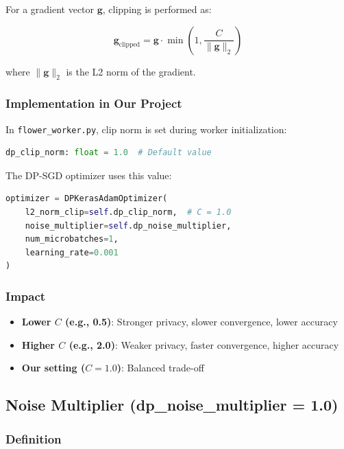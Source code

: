\documentclass[12pt,a4paper]{article}
\begin{document}
For a gradient vector $\mathbf{g}$, clipping is performed as:

\begin{equation}
\mathbf{g}_{\text{clipped}} = \mathbf{g} \cdot \min\left(1, \frac{C}{\|\mathbf{g}\|_2}\right)
\end{equation}

where $\|\mathbf{g}\|_2$ is the L2 norm of the gradient.

\subsubsection{Implementation in Our Project}

In \texttt{flower\_worker.py}, clip norm is set during worker initialization:

\begin{lstlisting}[language=Python, basicstyle=\small]
dp_clip_norm: float = 1.0  # Default value
\end{lstlisting}

The DP-SGD optimizer uses this value:

\begin{lstlisting}[language=Python, basicstyle=\small]
optimizer = DPKerasAdamOptimizer(
    l2_norm_clip=self.dp_clip_norm,  # C = 1.0
    noise_multiplier=self.dp_noise_multiplier,
    num_microbatches=1,
    learning_rate=0.001
)
\end{lstlisting}

\subsubsection{Impact}

\begin{itemize}
    \item \textbf{Lower $C$ (e.g., 0.5)}: Stronger privacy, slower convergence, lower accuracy
    \item \textbf{Higher $C$ (e.g., 2.0)}: Weaker privacy, faster convergence, higher accuracy
    \item \textbf{Our setting ($C = 1.0$)}: Balanced trade-off
\end{itemize}

\subsection{Noise Multiplier (dp\_noise\_multiplier = 1.0)}

\subsubsection{Definition}
\end{document}
